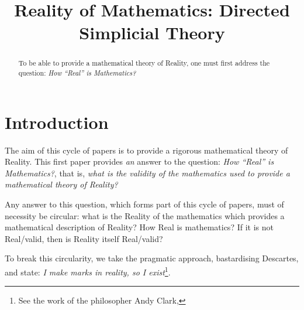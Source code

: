 \documentclass[a4paper,openany]{amsbook}
\begin{document}
\frontmatter
\sloppy

\title[DiSimplicial Theory]{Reality of Mathematics: Directed Simplicial Theory}

%

\begin{abstract}
To be able to provide a mathematical theory of Reality, one must first 
address the question: \textit{How ``Real'' is Mathematics?}
\end{abstract} 
\maketitle 
\tableofcontents 
\mainmatter

\section{Introduction}


The aim of this cycle of papers is to provide a rigorous mathematical theory of
Reality. This first paper provides \emph{an} answer to the question: \emph{How
``Real'' is Mathematics?}, that is, \emph{what is the validity of the
mathematics used to provide a mathematical theory of Reality?}

Any answer to this question, which forms part of this cycle of papers, must of
necessity be circular: what is the Reality of the mathematics which provides a
mathematical description of Reality? How Real is mathematics? If it is not
Real/valid, then is Reality itself Real/valid?

To break this circularity, we take the pragmatic approach, bastardising
Descartes, and state: \emph{I make marks in reality, so I exist}\footnote{See
the work of the philosopher Andy Clark, }.
\end{document}
